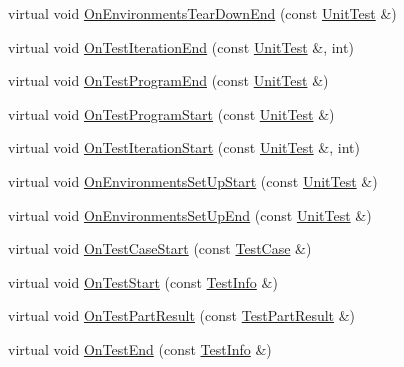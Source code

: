 \begin{DoxyCompactItemize}
\item 
virtual void \hyperlink{classtesting_1_1EmptyTestEventListener_af00cb6141021245e02c511782ce66b46}{\-On\-Environments\-Tear\-Down\-End} (const \hyperlink{classtesting_1_1UnitTest}{\-Unit\-Test} \&)
\item 
virtual void \hyperlink{classtesting_1_1EmptyTestEventListener_ae2104e936a08019242b519d2274237eb}{\-On\-Test\-Iteration\-End} (const \hyperlink{classtesting_1_1UnitTest}{\-Unit\-Test} \&, int)
\item 
virtual void \hyperlink{classtesting_1_1EmptyTestEventListener_a79232f629150d6a1e560f6729271e729}{\-On\-Test\-Program\-End} (const \hyperlink{classtesting_1_1UnitTest}{\-Unit\-Test} \&)
\item 
virtual void \hyperlink{classtesting_1_1EmptyTestEventListener_a9d43d6e5c4c37ade824998de2d83bd20}{\-On\-Test\-Program\-Start} (const \hyperlink{classtesting_1_1UnitTest}{\-Unit\-Test} \&)
\item 
virtual void \hyperlink{classtesting_1_1EmptyTestEventListener_abd0cb3cd389369f180bed8a9f855d30f}{\-On\-Test\-Iteration\-Start} (const \hyperlink{classtesting_1_1UnitTest}{\-Unit\-Test} \&, int)
\item 
virtual void \hyperlink{classtesting_1_1EmptyTestEventListener_a960b8082afebb8b336547c3dc6bd079f}{\-On\-Environments\-Set\-Up\-Start} (const \hyperlink{classtesting_1_1UnitTest}{\-Unit\-Test} \&)
\item 
virtual void \hyperlink{classtesting_1_1EmptyTestEventListener_a4ab2823e779a053ad65cf7f01bb76b54}{\-On\-Environments\-Set\-Up\-End} (const \hyperlink{classtesting_1_1UnitTest}{\-Unit\-Test} \&)
\item 
virtual void \hyperlink{classtesting_1_1EmptyTestEventListener_ad458fc9c991a0888807d241e90da098e}{\-On\-Test\-Case\-Start} (const \hyperlink{classtesting_1_1TestCase}{\-Test\-Case} \&)
\item 
virtual void \hyperlink{classtesting_1_1EmptyTestEventListener_a4ee6b680b188b358efdd3705aaa67c66}{\-On\-Test\-Start} (const \hyperlink{classtesting_1_1TestInfo}{\-Test\-Info} \&)
\item 
virtual void \hyperlink{classtesting_1_1EmptyTestEventListener_af67393a10ad8d397e2c981f9d7aff7a6}{\-On\-Test\-Part\-Result} (const \hyperlink{classtesting_1_1TestPartResult}{\-Test\-Part\-Result} \&)
\item 
virtual void \hyperlink{classtesting_1_1EmptyTestEventListener_afa42d87fd1a3c0377447be4791d472c9}{\-On\-Test\-End} (const \hyperlink{classtesting_1_1TestInfo}{\-Test\-Info} \&)

\end{DoxyCompactItemize}
